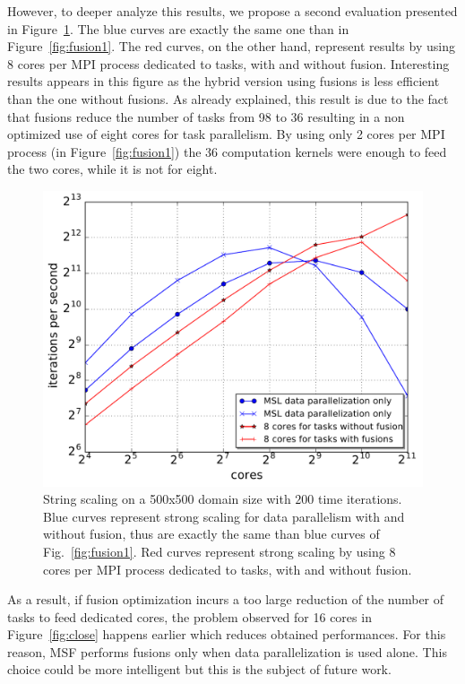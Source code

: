 However, to deeper analyze this results, we propose a second evaluation presented in Figure~\ref{fig:fusion2}. The blue curves are exactly the same one than in Figure~\ref{fig:fusion1}. The red curves, on the other hand, represent results by using 8 cores per MPI process dedicated to tasks, with and without fusion. Interesting results appears in this figure as the hybrid version using fusions is less efficient than the one without fusions. As already explained, this result is due to the fact that fusions reduce the number of tasks from 98 to 36 resulting in a non optimized use of eight cores for task parallelism. By using only 2 cores per MPI process (in Figure~\ref{fig:fusion1}) the 36 computation kernels were enough to feed the two cores, while it is not for eight.

\begin{figure}[!h]\begin{center}
  \includegraphics[width=.6\textwidth]{../results/task_scaling/500_200/withwithout8_close_median.pdf}
  \caption{String scaling on a 500x500 domain size with $200$ time iterations. Blue curves represent strong scaling for data parallelism with and without fusion, thus are exactly the same than blue curves of Fig.~\ref{fig:fusion1}. Red curves represent strong scaling by using 8 cores per MPI process dedicated to tasks, with and without fusion.}
  \label{fig:fusion2}
\end{center}\end{figure}
As a result, if fusion optimization incurs a too large reduction of the number of tasks to feed dedicated cores, the problem observed for 16 cores in Figure~\ref{fig:close} happens earlier which reduces obtained performances. For this reason, MSF performs fusions only when data parallelization is used alone. This choice could be more intelligent but this is the subject of future work.

